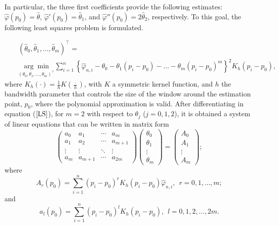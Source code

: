 \documentclass[preprint,12pt]{elsarticle}
\begin{document}
In particular, the three first coefficients provide the following estimates: $\widehat{\varphi}(p_0)=\widehat{\theta}$, $\widehat{\varphi}'(p_0)=\widehat{\theta}_1$, and $\widehat{\varphi}''(p_0)=2\widehat{\theta}_2$, respectively.
To this goal, the following least squares problem is formulated.

\begin{eqnarray}\label{LS}
&&\left(\widehat{\theta}_0,\widehat{\theta}_1,\ldots,\widehat{\theta}_m\right)^{\intercal}= \\
\nonumber &&\underset{\left({\theta}_0,\theta_1,\ldots, {\theta}_m\right)^{\intercal}}{\arg \min} \sum_{i=1}^n\left\{\widehat{\varphi}_{n,i}-\theta_0-\theta_1(p_i-p_0)-\ldots-\theta_m(p_i-p_0)^m\right\}^2 K_h(p_i-p_0),
\end{eqnarray}
where $K_h(\cdot)=\frac{1}{h}K(\frac{\cdot}{h})$, with $K$ a symmetric kernel function, and $h$ the bandwidth parameter that controls the size of the window around the estimation point, $p_0$, where the polynomial approximation is valid.
After differentiating in equation ($\ref{LS}$), for $m=2$ with respect to $\theta_j$ ($j=0, 1, 2$), it is obtained a system of linear equations that can be written in matrix form
\begin{equation}\label{score}
\left(\begin{array}{cccc}
a_0 & a_1&\cdots &a_m \\ 
a_{1} & a_2&\cdots &a_{m+1}\\
\vdots & \vdots &\ddots &\vdots \\ 
a_m & a_{m+1}&\cdots &a_{2 m} 
\end{array}\right)
\left(\begin{array}{c}
 \theta_0 \\ 
\theta_1 \\ 
\vdots \\
\theta_m
 \end{array}\right)=
\left(\begin{array}{c} 
A_0 \\ 
A_1 \\ 
\vdots \\
A_m
 \end{array}\right);
\end{equation}
where 
\begin{equation}\label{bigA}
A_r(p_0)=\sum_{i=1}^n (p_i-p_0)^r K_h(p_i-p_0)\widehat{\varphi}_{n,i}, \ \ r=0,1,\ldots,m;
\end{equation}
and 
\begin{equation}\label{smallA}
a_l(p_0)=\sum_{i=1}^n(p_i-p_0)^l K_h(p_i-p_0), \ \ l=0,1,2,\ldots,2m.
\end{equation}
\end{document}
